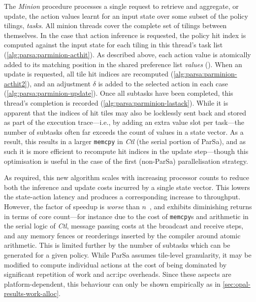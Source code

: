 The \emph{Minion} procedure processes a single request to retrieve and aggregate, or update, the action values learnt for an input state over some subset of the policy tilings, \emph{tasks}.
All minion threads cover the complete set of tilings between themselves.
In the case that action inference is requested, the policy hit index is computed against the input state for each tiling in this thread's task list (\cref{alg:parsa:parminion-acthit}).
As described above, each action value is atomically added to its matching position in the shared preference list \emph{values} ().
When an update is requested, all tile hit indices are recomputed (\cref{alg:parsa:parminion-acthit2}), and an adjustment $\delta$ is added to the selected action in each case (\cref{alg:parsa:parminion-update}).
Once all subtasks have been completed, this thread's completion is recorded (\cref{alg:parsa:parminion-lastack}).
While it is apparent that the indices of hit tiles may also be locklessly sent back and stored as part of the execution trace---i.e., by adding an extra value slot per task---the number of subtasks often far exceeds the count of values in a state vector.
As a result, this results in a larger \texttt{memcpy} in \emph{Ctl} (the serial portion of ParSa), and as such it is more efficient to recompute hit indices in the update step---though this optimisation is useful in the case of the first (non-ParSa) parallelisation strategy.

As required, this new algorithm scales with increasing processor counts to reduce both the inference and update costs incurred by a single state vector.
This lowers the state-action latency and produces a corresponding increase to throughput.
However, the factor of speedup is \emph{worse} than $n$~\unit{\times}, and exhibits diminishing returns in terms of core count---for instance due to the cost of \texttt{memcpy}s and arithmetic in the serial logic of \emph{Ctl}, message passing costs at the broadcast and receive steps, and any memory fences or reorderings inserted by the compiler around atomic arithmetic.
This is limited further by the number of subtasks which can be generated for a given policy.
While ParSa assumes tile-level granularity, it may be modified to compute individual actions at the cost of being dominated by significant repetition of work and \gls{acr:ipc} overheads.
Since these aspects are platform-dependent, this behaviour can only be shown empirically as in \cref{sec:opal-results-work-alloc}.